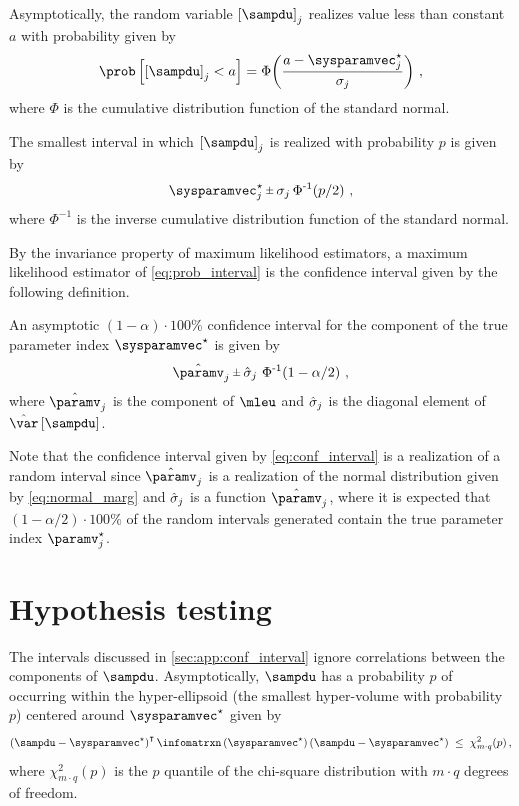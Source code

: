 \documentclass[../main.tex]{subfiles}
\begin{document}
Asymptotically, the random variable $\left[\sampdu\right]_j$ realizes value less than constant $a$ with probability given by
\begin{equation}
    \prob\left[\left[\sampdu\right]_j < a \right] = \operatorname{\Phi}\!\left(\frac{a - \tparam\sysparamvec_j}{\sigma_j}\right)\,,
\end{equation}
where $\Phi$ is the cumulative distribution function of the standard normal.

The smallest interval in which $\left[\sampdu\right]_j$ is realized with probability $p$ is given by
\begin{equation}
\label{eq:prob_interval}
     \tparam\sysparamvec_j \, \raisebox{.2ex}{$\scriptstyle\pm$} \, \sigma_j \operatorname{\Phi^{-1}}\!\left(p/2\right)\,,
\end{equation}
where $\Phi^{-1}$ is the inverse cumulative distribution function of the standard normal.

By the invariance property of maximum likelihood estimators, a maximum likelihood estimator of \cref{eq:prob_interval} is the confidence interval given by the following definition.
\begin{definition}
\label{def:conf_interval}
An asymptotic $(1 - \alpha) \cdot 100 \%$ confidence interval for the \jth component of the true parameter index $\tparam\sysparamvec$ is given by
\begin{equation}
\label{eq:conf_interval}
    \estimator\paramv_j \, \raisebox{.2ex}{$\scriptstyle\pm$} \, \estimator{\sigma}_j \, \operatorname{\Phi^{-1}}\!\left(1-\alpha/2\right)\,,
\end{equation}
where $\estimator\paramv_j$ is the \jth component of $\mleu$ and $\hat{\sigma}_j$ is the \jth diagonal element of $\estimator{\var}\left[\sampdu\right]$.
\end{definition}
Note that the confidence interval given by \cref{eq:conf_interval} is a realization of a random interval since $\estimator\paramv_j$ is a realization of the normal distribution given by \cref{eq:normal_marg} and $\hat{\sigma}_j$ is a function $\estimator\paramv_j$, where it is expected that $(1-\alpha/2) \cdot 100 \%$ of the random intervals generated contain the true parameter index $\tparam\paramv_j$.

\section{Hypothesis testing}
\label{sec:app:conf_region}
The intervals discussed in \cref{sec:app:conf_interval} ignore correlations between the components of $\sampdu$. Asymptotically, $\sampdu$ has a probability $p$ of occurring within the hyper-ellipsoid (the smallest hyper-volume with probability $p$) centered around $\tparam\sysparamvec$ given by
\begin{equation}
\label{eq:conf_region}
    \left(\sampdu - \tparam\sysparamvec\right)^\intercal \infomatrxn\left(\tparam\sysparamvec\right)\left(\sampdu - \tparam\sysparamvec\right) \;\leq\; \chi_{m \cdot q}^{2}(p)\,,
\end{equation}
where $\chi_{m \cdot q}^2(p)$ is the $p$ quantile of the chi-square distribution with $m \cdot q$ degrees of freedom. 
\end{document}
